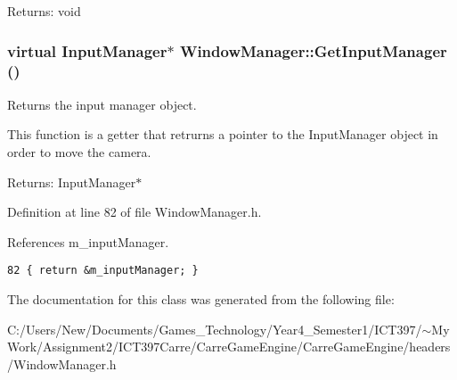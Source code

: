 \begin{Desc}
\item[Returns:]void \end{Desc}
\hypertarget{class_window_manager_a76f8df60f629cc88d98ab60e69278ed}{
\subsubsection[GetInputManager]{\setlength{\rightskip}{0pt plus 5cm}virtual InputManager$\ast$ WindowManager::GetInputManager ()}}
\label{class_window_manager_a76f8df60f629cc88d98ab60e69278ed}


Returns the input manager object. 

This function is a getter that retrurns a pointer to the InputManager object in order to move the camera.

\begin{Desc}
\item[Returns:]InputManager$\ast$ \end{Desc}


Definition at line 82 of file WindowManager.h.

References m\_\-inputManager.

\begin{Code}\begin{verbatim}82 { return &m_inputManager; }
\end{verbatim}
\end{Code}




The documentation for this class was generated from the following file:\begin{CompactItemize}
\item 
C:/Users/New/Documents/Games\_\-Technology/Year4\_\-Semester1/ICT397/$\sim$My Work/Assignment2/ICT397Carre/CarreGameEngine/CarreGameEngine/headers/WindowManager.h\end{CompactItemize}
